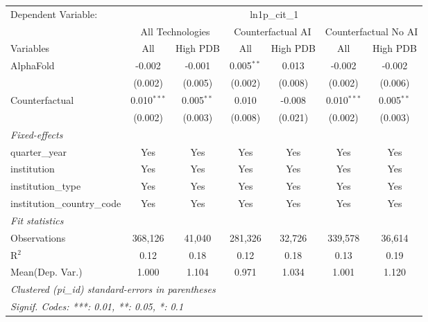 \begingroup
\centering
\begin{tabular}{lcccccc}
   \tabularnewline \midrule \midrule
   Dependent Variable: & \multicolumn{6}{c}{ln1p\_cit\_1}\\
 & \multicolumn{2}{c}{All Technologies} & \multicolumn{2}{c}{Counterfactual AI} & \multicolumn{2}{c}{Counterfactual No AI} \\
\cmidrule(lr){1-1}\cmidrule(lr){2-3} \cmidrule(lr){4-5} \cmidrule(lr){6-7}
Variables & \multicolumn{1}{c}{All} & \multicolumn{1}{c}{High PDB} & \multicolumn{1}{c}{All} & \multicolumn{1}{c}{High PDB} & \multicolumn{1}{c}{All} & \multicolumn{1}{c}{High PDB} \\
\cmidrule(lr){1-1}\cmidrule(lr){2-2} \cmidrule(lr){3-3} \cmidrule(lr){4-4} \cmidrule(lr){5-5} \cmidrule(lr){6-6} \cmidrule(lr){7-7}
   AlphaFold                    & -0.002        & -0.001       & 0.005$^{**}$ & 0.013   & -0.002        & -0.002\\   
                                & (0.002)       & (0.005)      & (0.002)      & (0.008) & (0.002)       & (0.006)\\   
   Counterfactual               & 0.010$^{***}$ & 0.005$^{**}$ & 0.010        & -0.008  & 0.010$^{***}$ & 0.005$^{**}$\\   
                                & (0.002)       & (0.003)      & (0.008)      & (0.021) & (0.002)       & (0.003)\\   
   \midrule
   \emph{Fixed-effects}\\
   quarter\_year                & Yes           & Yes          & Yes          & Yes     & Yes           & Yes\\  
   institution                  & Yes           & Yes          & Yes          & Yes     & Yes           & Yes\\  
   institution\_type            & Yes           & Yes          & Yes          & Yes     & Yes           & Yes\\  
   institution\_country\_code   & Yes           & Yes          & Yes          & Yes     & Yes           & Yes\\  
   \midrule
   \emph{Fit statistics}\\
   Observations                 & 368,126       & 41,040       & 281,326      & 32,726  & 339,578       & 36,614\\  
   R$^2$                        & 0.12          & 0.18         & 0.12         & 0.18    & 0.13          & 0.19\\  
Mean(Dep. Var.) & 1.000 & 1.104 & 0.971 & 1.034 & 1.001 & 1.120 \\
   \midrule \midrule
   \multicolumn{7}{l}{\emph{Clustered (pi\_id) standard-errors in parentheses}}\\
   \multicolumn{7}{l}{\emph{Signif. Codes: ***: 0.01, **: 0.05, *: 0.1}}\\
\end{tabular}
\par\endgroup
